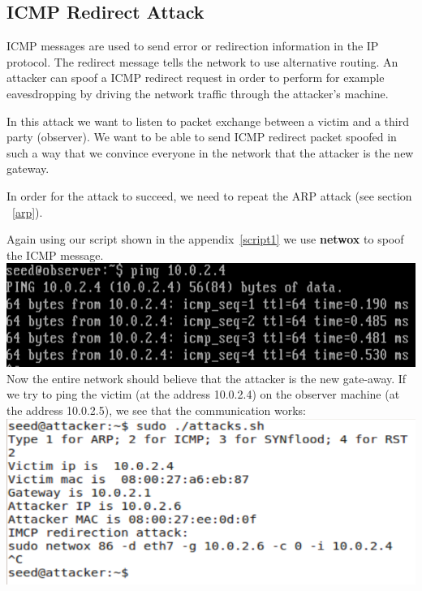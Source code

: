 \documentclass[12pt, a4paper, pdflatex]{article}
\begin{document}
\subsection{ICMP Redirect Attack}

ICMP messages are used to send error or redirection information in the IP protocol. The redirect message tells the network to use alternative routing. An attacker can spoof a ICMP redirect request in order to perform for example eavesdropping by driving the network traffic through the attacker's machine.

In this attack we want to listen to packet exchange between a victim and a third party (observer). We want to be able to send ICMP redirect packet spoofed in such a way that we convince everyone in the network that the attacker is the new gateway.

In order for the attack to succeed, we need to repeat the ARP attack (see section ~\ref{arp}).

Again using our script shown in the appendix~\ref{script1} we use \textbf{netwox} to spoof the ICMP message.\\

\includegraphics[width=.95\textwidth]{gfx/imcp-ping}\\

Now the entire network should believe that the attacker is the new gate-away. If we try to ping the victim (at the address 10.0.2.4) on the observer machine (at the address 10.0.2.5), we see that the communication works:\\

\includegraphics[width=.95\textwidth]{gfx/imcp-netwox}\\
\end{document}
